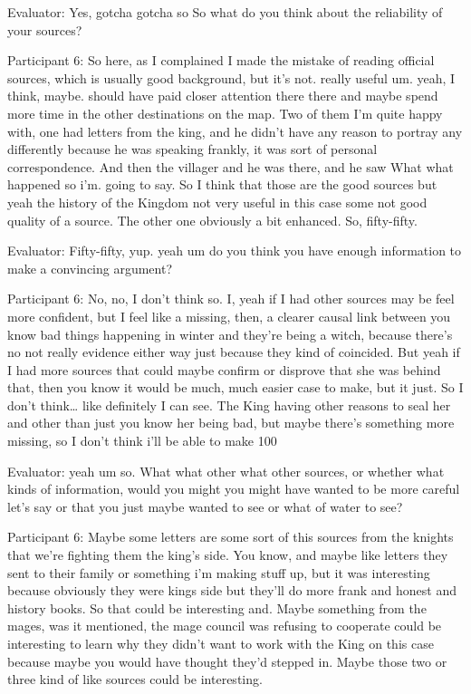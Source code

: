 \documentclass{l4proj}
\begin{document}
\begin{appendices}
Evaluator: Yes, gotcha gotcha so So what do you think about the reliability of your sources?

Participant 6:  So here, as I complained I made the mistake of reading official sources, which is usually good background, but it's not. really useful um. yeah, I think, maybe. should have paid closer attention there there and maybe spend more time in the other destinations on the map. Two of them I’m quite happy with, one had letters from the king, and he didn’t have any reason to portray any differently because he was speaking frankly, it was sort of personal correspondence. And then the villager and he was there, and he saw What what happened so i'm. going to say. So I think that those are the good sources but yeah the history of the Kingdom not very useful in this case some not good quality of a source. The other one obviously a bit enhanced. So, fifty-fifty. 

Evaluator: Fifty-fifty, yup. yeah um do you think you have enough information to make a convincing argument?

Participant 6: No, no, I don’t think so. I, yeah if I had other sources may be feel more confident, but I feel like a missing, then, a clearer causal link between you know bad things happening in winter and they're being a witch, because there's no not really evidence either way just because they kind of coincided. But yeah if I had more sources that could maybe confirm or disprove that she was behind that, then you know it would be much, much easier case to make, but it just. So I don't think… like definitely I can see. The King  having other reasons to seal her and other than just you know her being bad, but maybe there's something more   missing, so I don't think i'll be able to make 100%

Evaluator: yeah um so. What what other what other sources, or whether what kinds of information, would you might you might have wanted to be more careful let's say or that you just maybe wanted to see or what of water to see?

Participant 6: Maybe some letters are some sort of this sources from the knights that we're fighting them the king’s side. You know, and maybe like letters they sent to their family or something i'm making stuff up, but it was interesting because obviously they were kings side but they'll do more frank and honest and history books. So that could be interesting and. Maybe something from the mages, was it mentioned, the mage council was refusing to cooperate could be interesting to learn why they didn't want to work with the King on this case because maybe you would have thought they’d stepped in. Maybe those two or three kind of like sources could be interesting.


\end{appendices}
\end{document}
